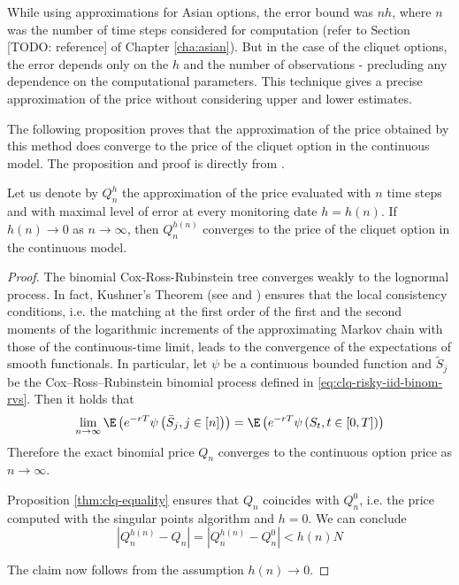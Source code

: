 \begin{rem}
	While using approximations for Asian options, the error bound was $ nh $, where $ n $ was the number of time steps considered for computation (refer to Section [TODO: reference] of Chapter \ref{cha:asian}). But in the case of the cliquet options, the error depends only on the $ h $ and the number of observations - precluding any dependence on the computational parameters. This technique gives a precise approximation of the price without considering upper and lower estimates.
\end{rem}

The following proposition proves that the approximation of the price obtained by this method does converge to the price of the cliquet option in the continuous model. The proposition and proof is directly from \cite{Gaudenzi2011}.


\begin{prp}
	\label{thm:convergence-continuous}
	Let us denote by $ Q_n^h $ the approximation of the price evaluated with $ n $ time steps and with maximal level of error at every monitoring date $ h = h(n) $. If $ h(n) \to 0 $ as $ n \to \infty $, then $ Q_n^{h(n)} $ converges to the price of the cliquet option in the continuous model.
\end{prp}

\begin{proof}
	The binomial Cox-Ross-Rubinstein tree converges weakly to the lognormal process. In fact, Kushner’s Theorem (see \cite{kushner1984approximation} and \cite{Kushner:1992:NMS:151172}) ensures that the local consistency conditions, i.e. the matching at the first order of the first and the second moments of the logarithmic increments of the approximating Markov chain
	with those of the continuous-time limit, leads to the convergence of the expectations of smooth functionals. In particular, let $ \psi $ be a continuous bounded function and $ \tilde{S}_j $ be the Cox–Ross–Rubinstein binomial process defined in \ref{eq:clq-risky-iid-binom-rvs}. Then it holds that
	\begin{equation*}
		\lim_{n \to \infty} \E \left( e^{-rT} \psi \left( \bar{S}_j, j \in [n] \right) \right)  =  \E \left( e^{-rT} \psi \left( S_t, t \in [0, T] \right) \right)
	\end{equation*}
	Therefore the exact binomial price $ Q_n $ converges to the continuous option price as $ n \to \infty $.
	
	Proposition \ref{thm:clq-equality} ensures that $ Q_n $ coincides with $ Q_n^0 $, i.e. the price computed with the
	singular points algorithm and $ h = 0 $. We can conclude
	\begin{equation*}
		\left|   Q_n^{h(n)} - Q_n  \right|  =  \left|   Q_n^{h(n)} - Q_n^0  \right|  <  h(n) N
	\end{equation*}
	
	The claim now follows from the assumption $ h(n) \to 0 $.
\end{proof}


